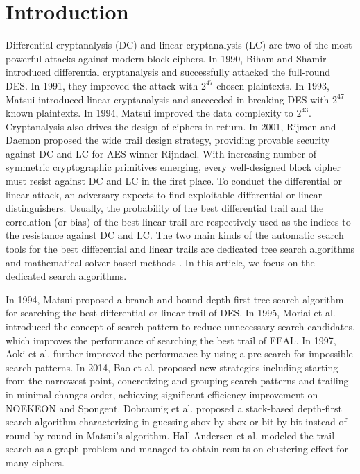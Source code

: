 \section{Introduction}

Differential cryptanalysis (DC) \cite{BS91,BS92} and linear cryptanalysis (LC) \cite{M93,M94_1} are two of the most powerful attacks against modern block ciphers. In 1990, Biham and Shamir introduced differential cryptanalysis and successfully attacked the full-round DES\cite{BS92}. In 1991, they improved the attack with $2^{47}$ chosen plaintexts\cite{BS92}. In 1993, Matsui introduced linear cryptanalysis and succeeded in breaking DES with $2^{47}$ known plaintexts\cite{M93}. In 1994, Matsui improved the data complexity to $2^{43}$\cite{M94_1}. Cryptanalysis also drives the design of ciphers in return. In 2001, Rijmen and Daemon proposed the wide trail design strategy\cite{DR01}, providing provable security against DC and LC for AES winner Rijndael\cite{DR98}. With increasing number of symmetric cryptographic primitives emerging, every well-designed block cipher must resist against DC and LC in the first place. To conduct the differential or linear attack, an adversary expects to find exploitable differential or linear distinguishers. Usually, the probability of the best differential trail and the correlation (or bias) of the best linear trail are respectively used as the indices to the resistance against DC and LC. The two main kinds of the automatic search tools for the best differential and linear trails are dedicated tree search algorithms \cite{M94_2,OMA95,AKM97,BZL14} and mathematical-solver-based methods \cite{MWG12,SHW14-1,SHW14-2,ZZDX19}. In this article, we focus on the dedicated search algorithms. 

In 1994, Matsui proposed a branch-and-bound depth-first tree search algorithm for searching the best differential or linear trail of DES\cite{M94_2}. In 1995, Moriai et al. introduced the concept of search pattern to reduce unnecessary search candidates, which improves the performance of searching the best trail of FEAL\cite{OMA95}. In 1997, Aoki et al. further improved the performance by using a pre-search for impossible search patterns\cite{AKM97}. In 2014, Bao et al. proposed new strategies including starting from the narrowest point, concretizing and grouping search patterns and trailing in minimal changes order, achieving significant efficiency improvement on NOEKEON and Spongent\cite{BZL14}. Dobraunig et al. \cite{DEM15} proposed a stack-based depth-first search algorithm characterizing in guessing sbox by sbox or bit by bit instead of round by round in Matsui's algorithm. Hall-Andersen et al. \cite{HV18} modeled the trail search as a graph problem and managed to obtain results on clustering effect for many ciphers. 

